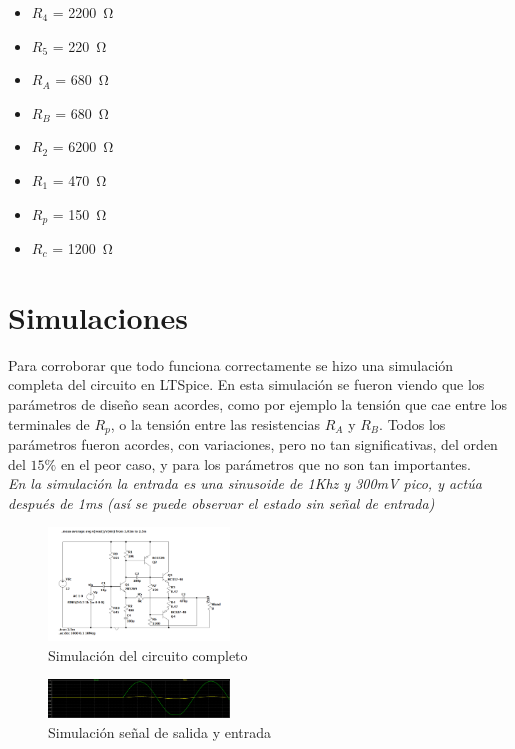 \documentclass[letterpaper, 10 pt, conference]{ieeeconf}  %
\begin{document}
\begin{itemize}
  \item{$R_4$ = \qty{2200}{\ohm}}
  \item{$R_5$ = \qty{220}{\ohm}}
  \item{$R_A$ = \qty{680}{\ohm}}
  \item{$R_B$ = \qty{680}{\ohm}}
  \item{$R_2$ = \qty{6200}{\ohm}}
  \item{$R_1$ = \qty{470}{\ohm}}
  \item{$R_p$ = \qty{150}{\ohm}}
  \item{$R_c$ = \qty{1200}{\ohm}}
\end{itemize}

\section{Simulaciones}

Para corroborar que todo funciona correctamente se hizo una simulación completa del circuito en LTSpice. En esta simulación se fueron viendo que los parámetros de diseño sean acordes, como por ejemplo la tensión que cae entre los terminales de $R_p$, o la tensión entre las resistencias $R_A$ y $R_B$. Todos los parámetros fueron acordes, con variaciones, pero no tan significativas, del orden del $15\%$ en el peor caso, y para los parámetros que no son tan importantes. \\

\textit{En la simulación la entrada es una sinusoide de 1Khz y 300mV pico, y actúa después de 1ms (así se puede observar el estado sin señal de entrada)}

\begin{figure}[H]
  \centering
  \includegraphics[width=0.43\textwidth]{./imagenes/placa_completa_simulacion.png}
  \caption{Simulación del circuito completo}
\end{figure}

\begin{figure}[H]
  \centering
  \includegraphics[width=0.43\textwidth]{./imagenes/sim_salida_entrada.png}
  \caption{Simulación señal de salida y entrada}
\end{figure}
\end{document}
